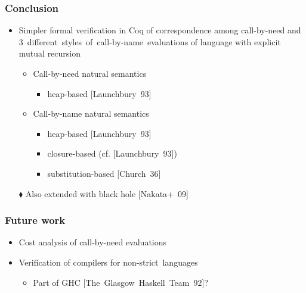 \documentclass[professionalfont,dvipdfmx,cjk,xcolor=dvipsnames,envcountsect,notheorems,12pt]{beamer}
\theoremstyle{definition}
\begin{document}
\begin{frame}
	\frametitle{Conclusion}
	\vspace{-2mm}
	\begin{itemize}
		\item \alert{Simpler formal verification} in Coq of correspondence among call-by-need and \mbox{3 different styles of call-by-name evaluations} of language with \alert{explicit mutual recursion}
			\begin{itemize}
				\item Call-by-need natural semantics
					\begin{itemize}
						\item heap-based {\small \mbox{[Launchbury 93]}}
					\end{itemize}
				\item Call-by-name natural semantics
					\begin{itemize}
						\item heap-based {\small \mbox{[Launchbury 93]}}
						\item closure-based {\small (cf. \mbox{[Launchbury 93]})}
						\item substitution-based {\small \mbox{[Church 36]}}
					\end{itemize}
			\end{itemize}
		\item[$\blacklozenge$] Also extended with black hole {\small \mbox{[Nakata+ 09]}} 
	\end{itemize}
\end{frame}

\begin{frame}
	\frametitle{Future work}
	\begin{itemize}
		\item Cost analysis of call-by-need evaluations
		\item Verification of compilers for \mbox{non-strict languages}
			\begin{itemize}
				\item Part of GHC {\small \mbox{[The Glasgow Haskell Team 92]}}?
			\end{itemize}
	\end{itemize}
\end{frame}
\end{document}
